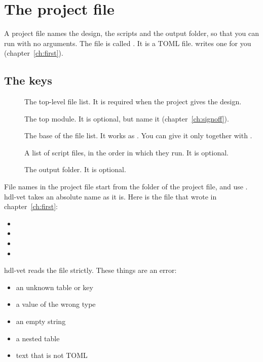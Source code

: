 \chapter{The project file}
\label{ch:project}

A project file names the design, the scripts and the output folder, so that you can
run  with no arguments. The file is called . It is
a TOML file.  writes one for you (chapter~\ref{ch:first}).

\section{The keys}

\begin{description}
\item[\code{[design]} ] The top-level file list. It is required when
  the project gives the design.
\item[\code{[design]} ] The top module. It is optional, but name it
  (chapter~\ref{ch:signoff}).
\item[\code{[design]} ] The base of the file list. It works as .
  You can give it only together with .
\item[\code{[apply]} ] A list of script files, in the order in which they
  run. It is optional.
\item[\code{[apply]} ] The output folder. It is optional.
\end{description}

File names in the project file start from the folder of the project file, and use
\code{/}. hdl-vet takes an absolute name as it is. Here is the file that 
wrote in chapter~\ref{ch:first}:

\begin{itemize}
\item {}
\item {}
\item {}
\item {}
\end{itemize}

hdl-vet reads the file strictly. These things are an error:

\begin{itemize}
\item an unknown table or key
\item a value of the wrong type
\item an empty string
\item a nested table
\item text that is not TOML
\end{itemize}

